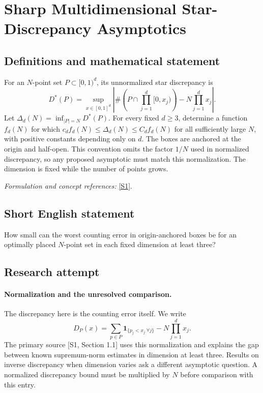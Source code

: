 \documentclass[11pt]{article}
\begin{document}
\section*{\texorpdfstring{Sharp Multidimensional Star-Discrepancy Asymptotics}{Sharp Multidimensional Star-Discrepancy Asymptotics}}\label{30002415}
\subsection{Definitions and mathematical statement}
For an $N$-point set $P\subset[0,1)^d$, its unnormalized star discrepancy is
\[
 D^*(P)=\sup_{x\in[0,1]^d}
 \left|\#\left(P\cap\prod_{j=1}^d[0,x_j)\right)-N\prod_{j=1}^dx_j\right|.
\]
Let $\Delta_d(N)=\inf_{|P|=N}D^*(P)$. For every fixed $d\ge3$, determine a function $f_d(N)$ for which $c_df_d(N)\le\Delta_d(N)\le C_df_d(N)$ for all sufficiently large $N$, with positive constants depending only on $d$. The boxes are anchored at the origin and half-open. This convention omits the factor $1/N$ used in normalized discrepancy, so any proposed asymptotic must match this normalization. The dimension is fixed while the number of points grows.
\par\smallskip\textit{Formulation and concept references:} \href{https://www-users.cse.umn.edu/~dbilyk/bilyk-research.pdf}{[S1]}.

\subsection{Short English statement}
How small can the worst counting error in origin-anchored boxes be for an optimally placed $N$-point set in each fixed dimension at least three?
\subsection{Research attempt}
\paragraph{Normalization and the unresolved comparison.}
The discrepancy here is the counting error itself. We write
\[
 D_P(x)=\sum_{p\in P}\mathbf1_{\{p_j<x_j\ \forall j\}}
                         -N\prod_{j=1}^dx_j.
\]
The primary source [S1, Section 1.1] uses this normalization and
explains the gap between known supremum-norm estimates in dimension
at least three. Results on inverse discrepancy when dimension varies
ask a different asymptotic question. A normalized discrepancy bound
must be multiplied by $N$ before comparison with this entry.
\end{document}
